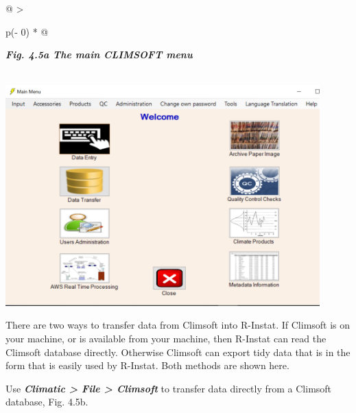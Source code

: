 \documentclass[
  letterpaper,
  DIV=11,
  numbers=noendperiod]{scrreprt}
\begin{document}
\begin{longtable}[]{@{}
  >{\raggedright\arraybackslash}p{(\columnwidth - 0\tabcolsep) * }@{}}
\toprule\noalign{}
\begin{minipage}[b]{\linewidth}\raggedright
\textbf{\emph{Fig. 4.5a The main CLIMSOFT menu}}
\end{minipage} \\
\midrule\noalign{}
\endhead
\bottomrule\noalign{}
\endlastfoot
\includegraphics[width=4.76951in,height=3.3581in]{figures/Fig4.5a.png} \\
\end{longtable}

There are two ways to transfer data from Climsoft into R-Instat. If
Climsoft is on your machine, or is available from your machine, then
R-Instat can read the Climsoft database directly. Otherwise Climsoft can
export tidy data that is in the form that is easily used by R-Instat.
Both methods are shown here.

Use \textbf{\emph{Climatic \textgreater{} File \textgreater{} Climsoft}}
to transfer data directly from a Climsoft database, Fig. 4.5b.
\end{document}
